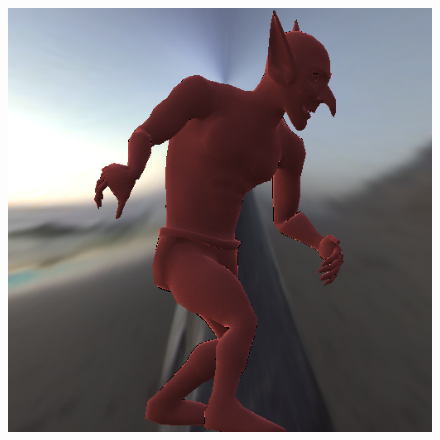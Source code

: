 \begin{figure}[H]
\endminipage\hfill
{}%
  \includegraphics[width=\linewidth]{./Imagens/brdfs/minnaert-goblin.png}
\endminipage
\end{figure}

